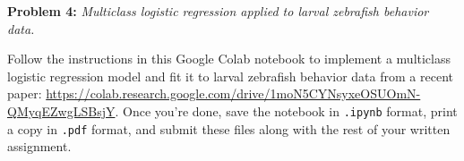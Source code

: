 \documentclass[11pt]{article}
\begin{document}
\clearpage

\textbf{Problem 4:} \textit{Multiclass logistic regression applied to larval zebrafish behavior data.}  

Follow the instructions in this Google Colab notebook to implement a multiclass logistic regression model and fit it to larval zebrafish behavior data from a recent paper: 
\url{https://colab.research.google.com/drive/1moN5CYNsyxeOSUOmN-QMyqEZwgLSBsjY}.  Once you're done, save the notebook in \texttt{.ipynb} format, print a copy in \texttt{.pdf} format,
and submit these files along with the rest of your written assignment.
\end{document}
